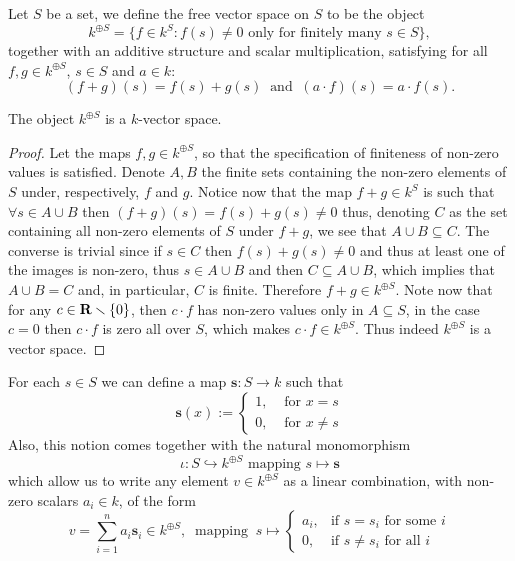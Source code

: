 \begin{definition}\label{def: free vector space}
   Let \(S\) be a set, we define the free vector space on \(S\) to be the object
   \[
      k^{\oplus S} = \{f \in k^S : f(s) \neq 0 \text{ only for finitely many }
      s \in S\},
   \]
   together with an additive structure and scalar multiplication, satisfying for
   all \(f, g \in k^{\oplus S}\), \(s \in S\) and \(a \in k\):
   \[
      (f + g)(s) = f(s) + g(s)\ \text{ and }\ (a \cdot f)(s) = a \cdot f(s).
   \]
\end{definition}

\begin{proposition}
   The object \(k^{\oplus S}\) is a \(k\)-vector space.
\end{proposition}

\begin{proof}
   Let the maps \(f, g \in k^{\oplus S}\), so that the specification of
   finiteness of non-zero values is satisfied. Denote \(A, B\) the finite sets
   containing the non-zero elements of \(S\) under, respectively, \(f\) and
   \(g\). Notice now that the map \(f + g \in k^S\) is such that \(\forall s \in
   A \cup B\) then \((f+g)(s) = f(s)+g(s) \neq  0\) thus, denoting \(C\) as the
   set containing all non-zero elements of \(S\) under \(f + g\), we see that \(A
   \cup B \subseteq C\). The converse is trivial since if \(s \in C\) then
   \(f(s) + g(s) \neq 0\) and thus at least one of the images is non-zero, thus
   \(s \in A \cup B\) and then \(C \subseteq  A \cup B\), which implies that \(A
   \cup B = C\) and, in particular, \(C\) is finite. Therefore \(f + g \in
   k^{\oplus S}\). Note now that for any \(c \in \mathbf{R} \smallsetminus \{0\}\),
   then \(c \cdot f\) has non-zero values only in \(A \subseteq S\), in the case
   \(c = 0\) then  \(c \cdot f\) is zero all over \(S\), which makes \(c \cdot f
   \in k^{\oplus S}\). Thus indeed \(k^{\oplus S}\) is a vector space.
\end{proof}

For each \(s \in S\) we can define a map \(\mathbf{s} : S \to k\) such that
\[
   \mathbf{s}(x) :=
   \begin{cases}
      1, &\text{ for } x = s\\
      0, &\text{ for } x \neq s
   \end{cases}
\]
Also, this notion comes together with the natural monomorphism
\[
   \iota : S \hookrightarrow k^{\oplus S} \text{ mapping } s \mapsto \mathbf{s}
\]
which allow us to write any element \(v \in k^{\oplus S}\) as a linear
combination, with non-zero scalars \(a_i \in k\), of the form
\[
   v = \sum_{i=1}^n a_i \mathbf{s}_i \in k^{\oplus S},\
   \text{ mapping }\ s \mapsto
   \begin{cases}
      a_i, &\text{if } s = s_i \text{ for some } i \\
      0, &\text{if } s \neq s_i \text{ for all } i
   \end{cases}
\]

